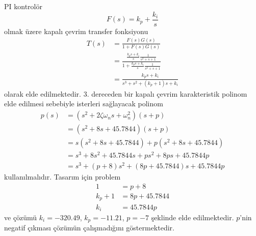 PI kontrolör
\begin{equation}
    F(s)=k_p+\frac{k_i}{s}
\end{equation}
olmak üzere kapalı çevrim transfer fonksiyonu 
\begin{equation}
\begin{split}
    T(s)&=\frac{F(s)G(s)}{1+F(s)G(s)}\\
    &=\frac{\frac{k_ps+k_i}{s}\frac{1}{s^2+s+1}}{1+\frac{k_ps+k_i}{s}\frac{1}{s^2+s+1}}\\
    &=\frac{k_ps+k_i}{s^3+s^2+(k_p+1)s+k_i}
\end{split}
\end{equation}
olarak elde edilmektedir. 3. dereceden bir kapalı çevrim karakteristik polinom elde edilmesi sebebiyle 
isterleri sağlayacak polinom
\begin{equation}
\begin{split}
    p(s)&=(s^2+2\zeta\omega_n s+\omega_n^2)(s+p)\\
    &=(s^2+8s+45.7844)(s+p)\\
    &=s(s^2+8s+45.7844)+p(s^2+8s+45.7844)\\
    &=s^3+8s^2+45.7844s+ps^2+8ps+45.7844p\\
    &=s^3+(p+8)s^2+(8p+45.7844)s+45.7844p
\end{split}
\end{equation}
kullanılmalıdır.
Tasarım için problem
\begin{equation}
\begin{split}
    1&=p+8\\
    k_p+1&=8p+45.7844\\
    k_i&=45.7844p
\end{split}
\end{equation}
ve çözümü $k_i=-320.49$, $k_p=-11.21$, $p=-7$ şeklinde elde edilmektedir. $p$'nin negatif çıkması çözümün çalışmadığını göstermektedir. 